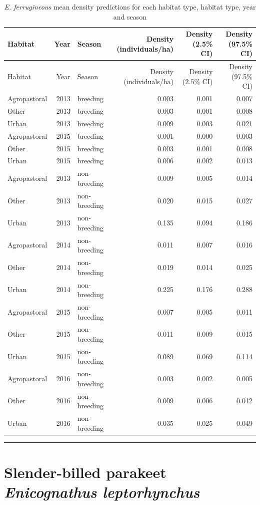 \documentclass[]{article}
\begin{document}
\begin{longtable}[]{@{}lrlrrr@{}}
\caption{\textit{E. ferrugineous} mean density predictions for each
habitat type, habitat type, year and season}\tabularnewline
\toprule
Habitat & Year & Season & Density (individuals/ha) & Density (2.5\% CI)
& Density (97.5\% CI)\tabularnewline
\midrule
\endfirsthead
\toprule
Habitat & Year & Season & Density (individuals/ha) & Density (2.5\% CI)
& Density (97.5\% CI)\tabularnewline
\midrule
\endhead
Agropastoral & 2013 & breeding & 0.003 & 0.001 & 0.007\tabularnewline
Other & 2013 & breeding & 0.003 & 0.001 & 0.008\tabularnewline
Urban & 2013 & breeding & 0.009 & 0.003 & 0.021\tabularnewline
Agropastoral & 2015 & breeding & 0.001 & 0.000 & 0.003\tabularnewline
Other & 2015 & breeding & 0.003 & 0.001 & 0.008\tabularnewline
Urban & 2015 & breeding & 0.006 & 0.002 & 0.013\tabularnewline
Agropastoral & 2013 & non-breeding & 0.009 & 0.005 &
0.014\tabularnewline
Other & 2013 & non-breeding & 0.020 & 0.015 & 0.027\tabularnewline
Urban & 2013 & non-breeding & 0.135 & 0.094 & 0.186\tabularnewline
Agropastoral & 2014 & non-breeding & 0.011 & 0.007 &
0.016\tabularnewline
Other & 2014 & non-breeding & 0.019 & 0.014 & 0.025\tabularnewline
Urban & 2014 & non-breeding & 0.225 & 0.176 & 0.288\tabularnewline
Agropastoral & 2015 & non-breeding & 0.007 & 0.005 &
0.011\tabularnewline
Other & 2015 & non-breeding & 0.011 & 0.009 & 0.015\tabularnewline
Urban & 2015 & non-breeding & 0.089 & 0.069 & 0.114\tabularnewline
Agropastoral & 2016 & non-breeding & 0.003 & 0.002 &
0.005\tabularnewline
Other & 2016 & non-breeding & 0.009 & 0.006 & 0.012\tabularnewline
Urban & 2016 & non-breeding & 0.035 & 0.025 & 0.049\tabularnewline
\bottomrule
\end{longtable}

\begin{center}\rule{0.5\linewidth}{\linethickness}\end{center}

\section{\texorpdfstring{Slender-billed parakeet \emph{Enicognathus
leptorhynchus}}{Slender-billed parakeet Enicognathus leptorhynchus}}\label{slender-billed-parakeet-enicognathus-leptorhynchus}
\end{document}
